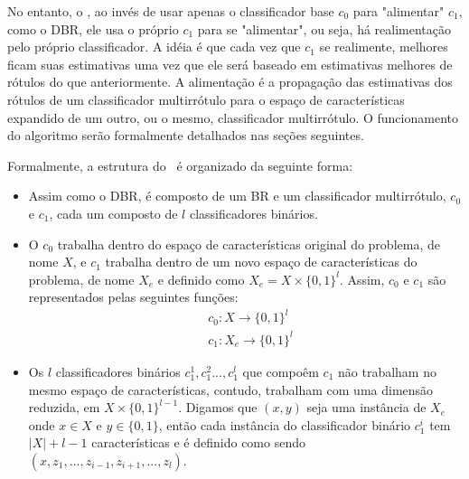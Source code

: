 No entanto, o \MRLMa, ao invés de usar apenas o classificador base $c_0$ para "alimentar" $c_1$, como o DBR,
ele usa o próprio $c_1$ para se "alimentar", ou seja, há realimentação pelo próprio classificador.
A idéia é que cada vez que $c_1$ se realimente, melhores ficam suas estimativas uma vez que ele será baseado
em estimativas melhores de rótulos do que anteriormente. 
A alimentação é a propagação das 
estimativas dos rótulos de um classificador multirrótulo para o espaço de características expandido de um outro, ou o mesmo,
classificador multirrótulo. O funcionamento do algoritmo serão formalmente detalhados nas seções seguintes.

Formalmente, a estrutura do \MRLMa~é organizado da seguinte forma:
\begin{itemize}
  \item Assim como o DBR, é composto de um BR e um classificador multirrótulo, $c_0$ e $c_1$,
  cada um composto de $l$ classificadores binários.
  \item O $c_0$ trabalha dentro do espaço de características original do problema, de nome $X$,
  e $c_1$ trabalha dentro de um novo espaço de características do problema, de nome $X_e$ e
   definido como $X_e=X \times \{0,1\}^{l}$. Assim, $c_0$ e $c_1$ são
  representados pelas seguintes funções:
  \begin{equation}
  \begin{split}
   & c_0 : X \rightarrow \{0,1\}^l \\
   & c_1 : X_e \rightarrow \{0,1\}^l
   \end{split}
  \end{equation}
  \item Os $l$ classificadores binários $c_1^1,c_1^2...,c_1^l$ que compoêm $c_1$ não trabalham no mesmo
  espaço de características, contudo,
  trabalham com uma dimensão reduzida, em $X \times \{0,1\}^{l-1}$. Digamos que $(x,y)$ seja uma instância de $X_e$
  onde $x \in X$ e $y \in \{0,1\}$, então cada instância 
  do classificador binário $c_1^i$ tem $|X|+l-1$ características e é definido como sendo $(x,z_1,...,z_{i-1},z_{i+1},...,z_{l})$.

  
%   
  

\end{itemize}
